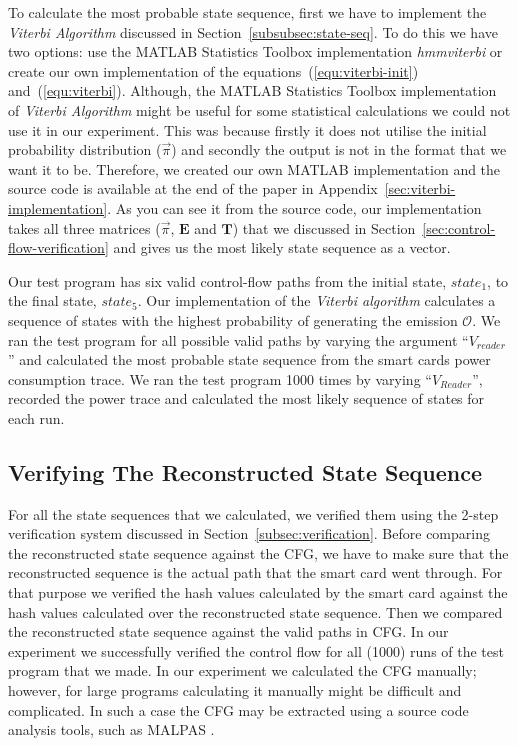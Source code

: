 \documentclass[lnicst]{svmultln}
\begin{document}
To calculate the most probable state sequence, first we have to implement the \emph{Viterbi Algorithm} discussed in Section~\ref{subsubsec:state-seq}. To do this we have two options: use the MATLAB \cite{matlab} Statistics Toolbox implementation \emph{hmmviterbi}\cite{hmm-viterbi} or create our own implementation of the equations~(\ref{equ:viterbi-init}) and~(\ref{equ:viterbi}). Although, the MATLAB Statistics Toolbox implementation of \emph{Viterbi Algorithm} might be useful for some statistical calculations we could not use it in our experiment. This was because firstly it does not utilise the initial probability distribution ($\vec{\pi}$) and secondly the output is not in the format that we want it to be. Therefore, we created our own MATLAB implementation and the source code is available at the end of the paper in Appendix~\ref{sec:viterbi-implementation}. As you can see it from the source code, our implementation takes all three matrices ($\vec{\pi}$, $\mathbf{E}$ and $\mathbf{T}$) that we discussed in Section~\ref{sec:control-flow-verification} and gives us the most likely state sequence as a vector.

Our test program has six valid control-flow paths from the initial state, $state_{1}$, to the final state, $state_{5}$. Our implementation of the \emph{Viterbi algorithm} calculates a sequence of states with the highest probability of generating the emission $\mathcal{O}$. We ran the test program for all possible valid paths by varying the argument ``$V_{reader}$'' and calculated the most probable state sequence from the smart cards power consumption trace. We ran the test program 1000 times by varying ``$V_{Reader}$'', recorded the power trace and calculated the most likely sequence of states for each run.

\subsection{Verifying The Reconstructed State Sequence}
\label{subsec:exp-verify}

For all the state sequences that we calculated, we verified them using the 2-step verification system discussed in Section~\ref{subsec:verification}. Before comparing the reconstructed state sequence against the CFG, we have to make sure that the reconstructed sequence is the actual path that the smart card went through. For that purpose we verified the hash values calculated by the smart card against the hash values calculated over the reconstructed state sequence. Then we compared the reconstructed state sequence against the valid paths in CFG. In our experiment we successfully verified the control flow for all (1000) runs of the test program that we made. In our experiment we calculated the CFG manually; however, for large programs calculating it manually might be difficult and complicated. In such a case the CFG may be extracted using a source code analysis tools, such as MALPAS \cite{malpas}. 
\end{document}
